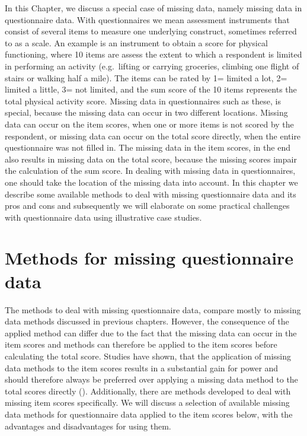 \documentclass[]{book}
\begin{document}
In this Chapter, we discuss a special case of missing data, namely
missing data in questionnaire data. With questionnaires we mean
assessment instruments that consist of several items to measure one
underlying construct, sometimes referred to as a scale. An example is an
instrument to obtain a score for physical functioning, where 10 items
are assess the extent to which a respondent is limited in performing an
activity (e.g.~lifting or carrying groceries, climbing one flight of
stairs or walking half a mile). The items can be rated by 1= limited a
lot, 2= limited a little, 3= not limited, and the sum score of the 10
items represents the total physical activity score. Missing data in
questionnaires such as these, is special, because the missing data can
occur in two different locations. Missing data can occur on the item
scores, when one or more items is not scored by the respondent, or
missing data can occur on the total score directly, when the entire
questionnaire was not filled in. The missing data in the item scores, in
the end also results in missing data on the total score, because the
missing scores impair the calculation of the sum score. In dealing with
missing data in questionnaires, one should take the location of the
missing data into account. In this chapter we describe some available
methods to deal with missing questionnaire data and its pros and cons
and subsequently we will elaborate on some practical challenges with
questionnaire data using illustrative case studies.

\section{Methods for missing questionnaire
data}\label{methods-for-missing-questionnaire-data}

The methods to deal with missing questionnaire data, compare mostly to
missing data methods discussed in previous chapters. However, the
consequence of the applied method can differ due to the fact that the
missing data can occur in the item scores and methods can therefore be
applied to the item scores before calculating the total score. Studies
have shown, that the application of missing data methods to the item
scores results in a substantial gain for power and should therefore
always be preferred over applying a missing data method to the total
scores directly (\citet{Eekhout2014}). Additionally, there are methods
developed to deal with missing item scores specifically. We will discuss
a selection of available missing data methods for questionnaire data
applied to the item scores below, with the advantages and disadvantages
for using them.
\end{document}
